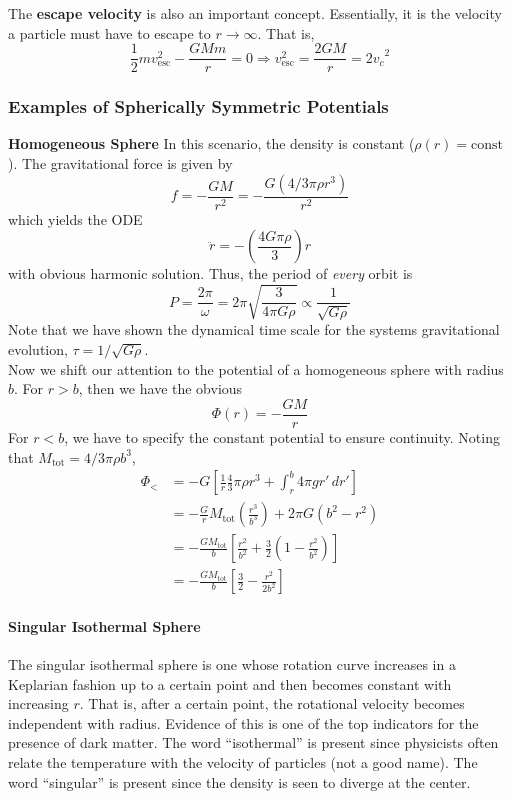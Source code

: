\documentclass[10pt]{article}
\newcommand{\n}{\noindent}
\begin{document}
	\n The \textbf{escape velocity} is also an important concept. Essentially, it is the velocity a particle must have to escape to $r\to\infty$. That is,
	\begin{equation}\label{escape1} \frac{1}{2}mv_{\mathrm{esc}}^2-\frac{GMm}{r}=0\Rightarrow v_{\mathrm{esc}}^2=\frac{2GM}{r}={2v_{c}}^2\end{equation}
	\subsubsection{Examples of Spherically Symmetric Potentials}
	\textbf{Homogeneous Sphere} In this scenario, the density is constant ($\rho(r)=\mathrm{const}$). The gravitational force is given by
	\begin{equation}\label{homogeneous1} f=-\frac{GM}{r^2}=-\frac{G(4/3 \pi\rho r^3)}{r^2}\end{equation}
	which yields the ODE
	\begin{equation}\label{homogeneous2} \ddot{r}=-\left(\frac{4G\pi \rho}{3}\right)r\end{equation}
	with obvious harmonic solution. Thus, the period of \emph{every} orbit is 
	\begin{equation}\label{homogeneous3} P=\frac{2\pi}{\omega}=2\pi\sqrt{\frac{3}{4\pi G\rho}}\propto \frac{1}{\sqrt{G\rho}}\end{equation}
	Note that we have shown the dynamical time scale for the systems gravitational evolution, $\tau=1/\sqrt{G\rho}$.\\
	
	\n Now we shift our attention to the potential of a homogeneous sphere with radius $b$. For $r>b$, then we have the obvious
	$$\Phi(r)=-\frac{GM}{r}$$
	For $r<b$, we have to specify the constant potential to ensure continuity. Noting that $M_{\mathrm{tot}} = 4/3 \pi\rho b^3$,
	\begin{align*}
	\Phi_<&=-G\left[\frac{1}{r}\frac{4}{3}\pi\rho r^3 + \int_r^b 4\pi g r'\,dr'\right]\\
	      &=-\frac{G}{r} M_{\mathrm{tot}}\left(\frac{r^3}{b^3}\right)+2\pi G(b^2-r^2)\\
	      &=-\frac{GM_{\mathrm{tot}}}{b}\left[\frac{r^2}{b^2}+\frac{3}{2}\left(1-\frac{r^2}{b^2}\right)\right]\\
	      &=-\frac{GM_{\mathrm{tot}}}{b}\left[\frac{3}{2}-\frac{r^2}{2b^2}\right]
	\end{align*}
	\paragraph{Singular Isothermal Sphere} The singular isothermal sphere  is one whose rotation curve increases in a Keplarian fashion up to a certain point and then becomes constant with increasing $r$. That is, after a certain point, the rotational velocity becomes independent with radius. Evidence of this is one of the top indicators for the presence of dark matter. The word ``isothermal'' is present since physicists often relate the temperature with the velocity of particles (not a good name). The word ``singular'' is present since the density is seen to diverge at the center.\\
	
\end{document}
